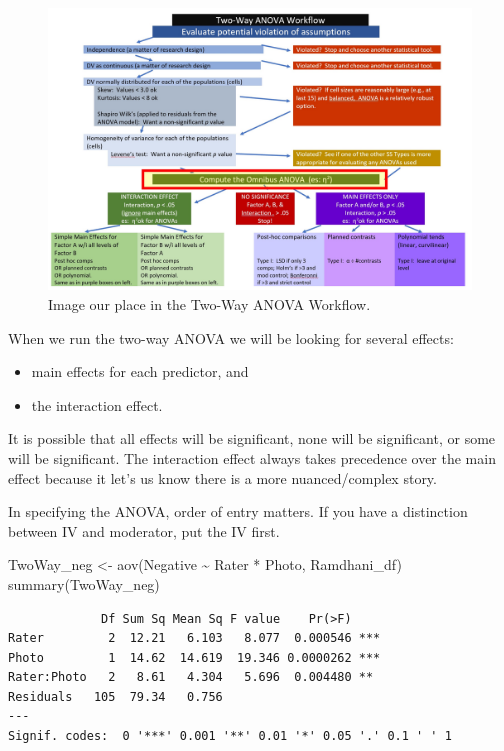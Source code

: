 \documentclass[
  11pt,
]{book}
\newenvironment{Shaded}{\begin{snugshade}}{\end{snugshade}}
\newcommand{\FunctionTok}[1]{\textcolor[rgb]{0.00,0.00,0.00}{#1}}
\newcommand{\NormalTok}[1]{#1}
\newcommand{\OtherTok}[1]{\textcolor[rgb]{0.56,0.35,0.01}{#1}}
\newcommand{\SpecialCharTok}[1]{\textcolor[rgb]{0.00,0.00,0.00}{#1}}
\providecommand{\tightlist}{%
  \setlength{\itemsep}{0pt}\setlength{\parskip}{0pt}}
\begin{document}
\begin{figure}
\centering
\includegraphics{images/factorial/WrkFlw_Omnibus.jpg}
\caption{Image our place in the Two-Way ANOVA Workflow.}
\end{figure}

When we run the two-way ANOVA we will be looking for several effects:

\begin{itemize}
\tightlist
\item
  main effects for each predictor, and
\item
  the interaction effect.
\end{itemize}

It is possible that all effects will be significant, none will be significant, or some will be significant. The interaction effect always takes precedence over the main effect because it let's us know there is a more nuanced/complex story.

In specifying the ANOVA, order of entry matters. If you have a distinction between IV and moderator, put the IV first.

\begin{Shaded}
\begin{Highlighting}[]
\NormalTok{TwoWay\_neg }\OtherTok{\textless{}{-}} \FunctionTok{aov}\NormalTok{(Negative }\SpecialCharTok{\textasciitilde{}}\NormalTok{ Rater }\SpecialCharTok{*}\NormalTok{ Photo, Ramdhani\_df)}
\FunctionTok{summary}\NormalTok{(TwoWay\_neg)}
\end{Highlighting}
\end{Shaded}

\begin{verbatim}
             Df Sum Sq Mean Sq F value    Pr(>F)    
Rater         2  12.21   6.103   8.077  0.000546 ***
Photo         1  14.62  14.619  19.346 0.0000262 ***
Rater:Photo   2   8.61   4.304   5.696  0.004480 ** 
Residuals   105  79.34   0.756                      
---
Signif. codes:  0 '***' 0.001 '**' 0.01 '*' 0.05 '.' 0.1 ' ' 1
\end{verbatim}
\end{document}
